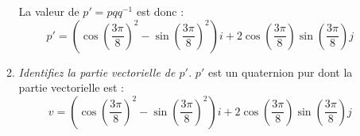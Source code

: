 \documentclass[a4paper,12pt]{article}
\begin{document}
\begin{enumerate}
\begin{enumerate}
\begin{equation}
              \end{equation}
              La valeur de \(p' = p q q^{-1} \) est donc :
              \begin{equation}
              \boxed{p' = (\cos(\frac{3 \pi}{8})^2 - \sin(\frac{3 \pi}{8})^2) i + 2 \cos(\frac{3 \pi}{8}) \sin(\frac{3 \pi}{8}) j}
              \end{equation}
              \item \emph{Identifiez la partie vectorielle de $p'$.} \newline \newline 
              $p'$ est un quaternion pur dont la partie vectorielle est : \newline
              \begin{equation}
              \boxed{v = (\cos(\frac{3 \pi}{8})^2 - \sin(\frac{3 \pi}{8})^2) i + 2 \cos(\frac{3 \pi}{8}) \sin(\frac{3 \pi}{8}) j}
              \end{equation}
          \end{enumerate}


\end{enumerate}
\end{document}
